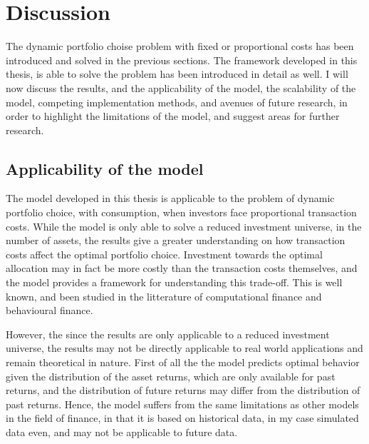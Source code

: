 \documentclass[11pt]{article}
\begin{document}
\fi

\section{Discussion} \label{Section: Discussion}
The dynamic portfolio choise problem with fixed or proportional costs has been introduced and solved in the previous sections.
The framework developed in this thesis, is able to solve the problem has been introduced in detail as well.
I will now discuss the results, and the applicability of the model, the scalability of the model, competing implementation methods, and avenues of future research,
in order to highlight the limitations of the model, and suggest areas for further research.

\subsection{Applicability of the model} \label{Subsection: Applicability of the model}
The model developed in this thesis is applicable to the problem of dynamic portfolio choice, with consumption, when investors face proportional transaction costs.
While the model is only able to solve a reduced investment universe, in the number of assets, the
results give a greater understanding on how transaction costs affect the optimal portfolio choice.
Investment towards the optimal allocation may in fact be more costly than the transaction costs themselves, and the model provides a framework for understanding this trade-off.
This is well known, and been studied in the litterature of computational finance and behavioural finance.

However, the since the results are only applicable to a reduced investment universe, the results may not be directly applicable to real world applications
and remain theoretical in nature. First of all the the model predicts optimal behavior given the distribution of the asset returns,
which are only available for past returns, and the distribution of future returns may differ from the distribution of past returns.
Hence, the model suffers from the same limitations as other models in the field of finance, in that it is based on historical data,
in my case simulated data even, and may not be applicable to future data.
\end{document}
